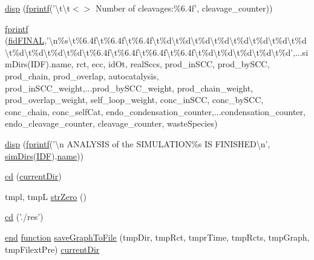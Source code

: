 \begin{DoxyCompactItemize}
\item 
\hyperlink{a00028_addecf583f3edbdfaa0e69cb8a9bb6586}{disp} (\hyperlink{a00110_aa6dc40efe43a338c9ff278260d95b4d9}{fprintf}('\textbackslash{}t\textbackslash{}t$<$$>$ Number of cleavages\-:\%6.\-4f', cleavage\-\_\-counter))
\item 
\hyperlink{a00028_af79a1146c94c3bcca287ad78df8a0c42}{fprintf} (\hyperlink{a00028_a2f1bf22f6a0c3f5791577061e92c0433}{fid\-F\-I\-N\-A\-L},'\textbackslash{}n\%s\textbackslash{}t\%6.\-4f\textbackslash{}t\%6.\-4f\textbackslash{}t\%6.\-4f\textbackslash{}t\%d\textbackslash{}t\%d\textbackslash{}t\%d\textbackslash{}t\%d\textbackslash{}t\%d\textbackslash{}t\%d\textbackslash{}t\%d\textbackslash{}t\%d\textbackslash{}t\%d\textbackslash{}t\%d\textbackslash{}t\%d\textbackslash{}t\%d\textbackslash{}t\%6.\-4f\textbackslash{}t\%6.\-4f\textbackslash{}t\%6.\-4f\textbackslash{}t\%6.\-4f\textbackslash{}t\%d\textbackslash{}t\%d\textbackslash{}t\%d\textbackslash{}t\%d\textbackslash{}t\%d',...\-sim\-Dirs(\-I\-D\-F).\-name, rct, ecc, id\-Ot, real\-Sccs, prod\-\_\-in\-S\-C\-C, prod\-\_\-by\-S\-C\-C, prod\-\_\-chain, prod\-\_\-overlap, autocatalysis, prod\-\_\-in\-S\-C\-C\-\_\-weight,...\-prod\-\_\-by\-S\-C\-C\-\_\-weight, prod\-\_\-chain\-\_\-weight, prod\-\_\-overlap\-\_\-weight, self\-\_\-loop\-\_\-weight, conc\-\_\-in\-S\-C\-C, conc\-\_\-by\-S\-C\-C, conc\-\_\-chain, conc\-\_\-self\-Cat, endo\-\_\-condensation\-\_\-counter,...\-condensation\-\_\-counter, endo\-\_\-cleavage\-\_\-counter, cleavage\-\_\-counter, waste\-Species)
\item 
\hyperlink{a00028_ae78f56c55593a2ad4cf7d0cb6d0d1b9c}{disp} (\hyperlink{a00110_aa6dc40efe43a338c9ff278260d95b4d9}{fprintf}('\textbackslash{}n A\-N\-A\-L\-Y\-S\-I\-S of the S\-I\-M\-U\-L\-A\-T\-I\-O\-N\%s I\-S F\-I\-N\-I\-S\-H\-E\-D\textbackslash{}n', \hyperlink{a00031_aae5035eb84b89176ed5b06e136325eff}{sim\-Dirs}(\hyperlink{a00028_a8acdc1bee73718b1ffcfc7eb26968f48}{I\-D\-F}).\hyperlink{a00027_abbf559a76fab59203496b0847ab9502a}{name}))
\item 
\hyperlink{a00028_a4241e59001a956990321a269c236c993}{cd} (\hyperlink{a00031_af32eb97339f1e9d37b5540de2cbc79c9}{current\-Dir})
\item 
tmpl, tmp\-L \hyperlink{a00028_a28aa31ca6f19c013204a5cc60a75f0e0}{str\-Zero} ()
\item 
\hyperlink{a00028_a63abbca9e6cf3cec70e15675cb03913f}{cd} ('./res')
\item 
\hyperlink{a00025_afb358f48b1646c750fb9da6c6585be2b}{end} \hyperlink{a00110_a4b4c670b101bf7a838f775e008fa6255}{function} \hyperlink{a00028_a4436ee01db317f5aca8999e75f24e581}{save\-Graph\-To\-File} (tmp\-Dir, tmp\-Rct, tmpr\-Time, tmp\-Rcts, tmp\-Graph, tmp\-Filext\-Pre) \hyperlink{a00031_af32eb97339f1e9d37b5540de2cbc79c9}{current\-Dir}
$$
\end{DoxyCompactItemize}
